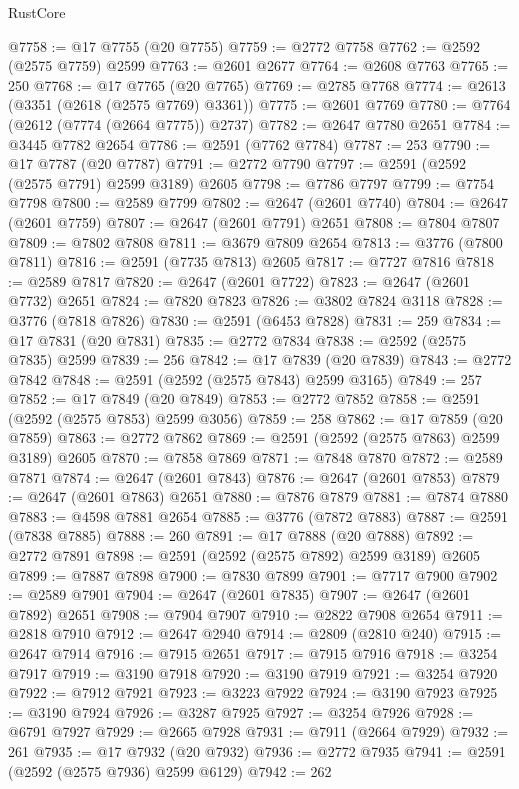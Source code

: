 \begin{lexlean}{RustCore}
\begin{coremodule}
@7758 := @17 @7755 (@20 @7755)
@7759 := @2772 @7758
@7762 := @2592 (@2575 @7759) @2599
@7763 := @2601 @2677
@7764 := @2608 @7763
@7765 := 250
@7768 := @17 @7765 (@20 @7765)
@7769 := @2785 @7768
@7774 := @2613 (@3351 (@2618 (@2575 @7769) @3361))
@7775 := @2601 @7769
@7780 := @7764 (@2612 (@7774 (@2664 @7775)) @2737)
@7782 := @2647 @7780 @2651
@7784 := @3445 @7782 @2654
@7786 := @2591 (@7762 @7784)
@7787 := 253
@7790 := @17 @7787 (@20 @7787)
@7791 := @2772 @7790
@7797 := @2591 (@2592 (@2575 @7791) @2599 @3189) @2605
@7798 := @7786 @7797
@7799 := @7754 @7798
@7800 := @2589 @7799
@7802 := @2647 (@2601 @7740)
@7804 := @2647 (@2601 @7759)
@7807 := @2647 (@2601 @7791) @2651
@7808 := @7804 @7807
@7809 := @7802 @7808
@7811 := @3679 @7809 @2654
@7813 := @3776 (@7800 @7811)
@7816 := @2591 (@7735 @7813) @2605
@7817 := @7727 @7816
@7818 := @2589 @7817
@7820 := @2647 (@2601 @7722)
@7823 := @2647 (@2601 @7732) @2651
@7824 := @7820 @7823
@7826 := @3802 @7824 @3118
@7828 := @3776 (@7818 @7826)
@7830 := @2591 (@6453 @7828)
@7831 := 259
@7834 := @17 @7831 (@20 @7831)
@7835 := @2772 @7834
@7838 := @2592 (@2575 @7835) @2599
@7839 := 256
@7842 := @17 @7839 (@20 @7839)
@7843 := @2772 @7842
@7848 := @2591 (@2592 (@2575 @7843) @2599 @3165)
@7849 := 257
@7852 := @17 @7849 (@20 @7849)
@7853 := @2772 @7852
@7858 := @2591 (@2592 (@2575 @7853) @2599 @3056)
@7859 := 258
@7862 := @17 @7859 (@20 @7859)
@7863 := @2772 @7862
@7869 := @2591 (@2592 (@2575 @7863) @2599 @3189) @2605
@7870 := @7858 @7869
@7871 := @7848 @7870
@7872 := @2589 @7871
@7874 := @2647 (@2601 @7843)
@7876 := @2647 (@2601 @7853)
@7879 := @2647 (@2601 @7863) @2651
@7880 := @7876 @7879
@7881 := @7874 @7880
@7883 := @4598 @7881 @2654
@7885 := @3776 (@7872 @7883)
@7887 := @2591 (@7838 @7885)
@7888 := 260
@7891 := @17 @7888 (@20 @7888)
@7892 := @2772 @7891
@7898 := @2591 (@2592 (@2575 @7892) @2599 @3189) @2605
@7899 := @7887 @7898
@7900 := @7830 @7899
@7901 := @7717 @7900
@7902 := @2589 @7901
@7904 := @2647 (@2601 @7835)
@7907 := @2647 (@2601 @7892) @2651
@7908 := @7904 @7907
@7910 := @2822 @7908 @2654
@7911 := @2818 @7910
@7912 := @2647 @2940
@7914 := @2809 (@2810 @240)
@7915 := @2647 @7914
@7916 := @7915 @2651
@7917 := @7915 @7916
@7918 := @3254 @7917
@7919 := @3190 @7918
@7920 := @3190 @7919
@7921 := @3254 @7920
@7922 := @7912 @7921
@7923 := @3223 @7922
@7924 := @3190 @7923
@7925 := @3190 @7924
@7926 := @3287 @7925
@7927 := @3254 @7926
@7928 := @6791 @7927
@7929 := @2665 @7928
@7931 := @7911 (@2664 @7929)
@7932 := 261
@7935 := @17 @7932 (@20 @7932)
@7936 := @2772 @7935
@7941 := @2591 (@2592 (@2575 @7936) @2599 @6129)
@7942 := 262

\end{coremodule}
\end{lexlean}
